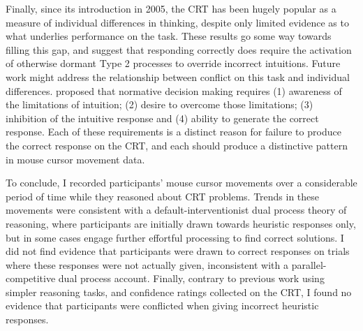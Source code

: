 Finally, since its introduction in 2005, the CRT has been hugely popular
as a measure of individual differences in thinking,
despite only limited evidence as to what underlies performance on the task.
These results go some way towards filling this gap,
and suggest that responding correctly
does require the activation of otherwise dormant Type 2 processes
to override incorrect intuitions.
Future work might address the relationship between
conflict on this task and individual differences.
\citet{Stanovich2008} proposed that normative decision making requires
(1) awareness of the limitations of intuition;
(2) desire to overcome those limitations;
(3) inhibition of the intuitive response and
(4) ability to generate the correct response.
Each of these requirements is a distinct reason for
failure to produce the correct response on the CRT,
and each should produce a distinctive pattern in mouse cursor movement data.

To conclude, I recorded participants' mouse cursor movements
over a considerable period of time
while they reasoned about CRT problems.
Trends in these movements were consistent with
a default-interventionist dual process theory of reasoning,
where participants are initially drawn towards heuristic responses only,
but in some cases engage further effortful processing to find correct solutions.
I did not find evidence that participants were
drawn to correct responses on trials where these responses were not actually given,
inconsistent with a parallel-competitive dual process account.
Finally, contrary to previous work using simpler reasoning tasks,
and confidence ratings collected on the CRT,
I found no evidence that participants were conflicted
when giving incorrect heuristic responses. 


